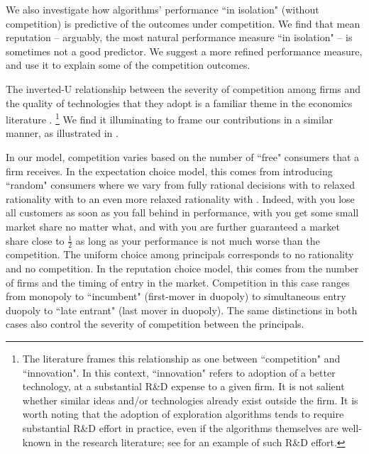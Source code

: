 {We also investigate how algorithms' performance ``in isolation" (without competition) is predictive of the outcomes under competition. We find that mean reputation -- arguably, the most natural performance measure ``in isolation" -- is sometimes not a good predictor. We suggest a
more refined performance measure, and use it to explain some of the competition outcomes.

The inverted-U relationship between the severity of competition among firms and the quality of technologies that they adopt is a familiar theme in the economics literature \citep[\eg][]{Aghion-QJE05,Vives-08}.%
\footnote{The literature frames this relationship as one between ``competition" and ``innovation". In this context, ``innovation" refers to adoption of a better technology, at a substantial R\&D expense to a given firm. It is not salient whether similar ideas and/or technologies already exist outside the firm. It is worth noting that the adoption of exploration algorithms tends to require substantial R\&D effort in practice, even if the algorithms themselves are well-known in the research literature; see \citet{MWT-WhitePaper-2016} for an example of such R\&D effort.}
We find it illuminating to frame our contributions in a similar manner, as illustrated in .

In our model, competition varies based on the number of ``free" consumers that a firm receives. In the expectation choice model, this comes from introducing ``random" consumers where we vary from fully rational decisions with \HardMax to relaxed rationality with \HardMaxRandom to an even more relaxed rationality with \SoftMaxRandom. Indeed, with \HardMax you lose all customers as soon as you fall behind in performance, with \HardMaxRandom you get some small market share no matter what, and with \SoftMaxRandom you are further guaranteed a market share close to $\tfrac12$ as long as your performance is not much worse than the competition. The uniform choice among principals corresponds to no rationality and no competition. In the reputation choice model, this comes from the number of firms and the timing of entry in the market. Competition in this case ranges from monopoly to ``incumbent" (first-mover in duopoly) to simultaneous entry duopoly to ``late entrant" (last mover in duopoly). The same distinctions in both cases also control the severity of competition between the principals.

}

